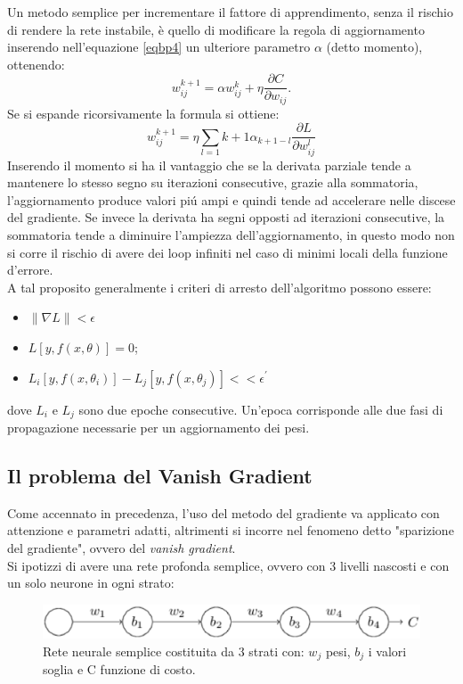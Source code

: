 \documentclass[a4paper,12pt,oneside]{book}
\begin{document}
Un metodo semplice per incrementare il fattore di apprendimento, senza il rischio di rendere la rete instabile, \`{e} quello di modificare la regola di aggiornamento inserendo nell'equazione \ref{eqbp4} un ulteriore parametro $\alpha$ (detto momento), ottenendo:
\begin{equation}
w_{ij}^{k+1}=\alpha w_{ij}^k + \eta \frac{\partial C}{\partial w_{ij}}.
\end{equation}
Se si espande ricorsivamente la formula si ottiene:
\begin{equation}
w_{ij}^{k+1}=\eta \sum_{l=1}{k+1}\alpha_{k+1-l}\frac{\partial L}{\partial w_{ij}^l}
\end{equation}
Inserendo il momento si ha il vantaggio che se la derivata parziale tende a mantenere lo stesso segno su iterazioni consecutive, grazie alla sommatoria, l'aggiornamento produce valori pi\'{u} ampi e quindi tende ad accelerare nelle discese del gradiente. Se invece la derivata ha segni opposti ad iterazioni consecutive, la sommatoria tende a diminuire l'ampiezza dell'aggiornamento, in questo modo non si corre il rischio di avere dei loop infiniti nel caso di minimi locali della funzione d'errore.\\
A tal proposito generalmente i criteri di arresto dell'algoritmo possono essere:
\begin{itemize}
\item $\lVert \nabla L\rVert < \epsilon$
\item $L[y,f(x,\theta)]=0$;
\item $L_i[y,f(x,\theta_i)]-L_j[y,f(x,\theta_j)]<<\epsilon^{\prime}$
\end{itemize}
dove $L_i$ e $L_j$ sono due epoche consecutive. Un'epoca corrisponde alle due fasi di propagazione necessarie per un aggiornamento dei pesi.
\subsection*{Il problema del Vanish Gradient}
Come accennato in precedenza, l'uso del metodo del gradiente va applicato con attenzione e parametri adatti, altrimenti si incorre nel fenomeno detto "sparizione del gradiente", ovvero del \textit{vanish gradient}.\\
Si ipotizzi di avere una rete profonda semplice, ovvero con 3 livelli nascosti e con un solo neurone in ogni strato:
\newpage
\begin{figure}[!t]
\centering
\includegraphics[scale=0.5]{vanish}
\caption{Rete neurale semplice costituita da 3 strati con: $w_j$ pesi, $b_j$ i valori soglia e C funzione di costo.}
\label{fig:vanish}
\end{figure}
\end{document}
